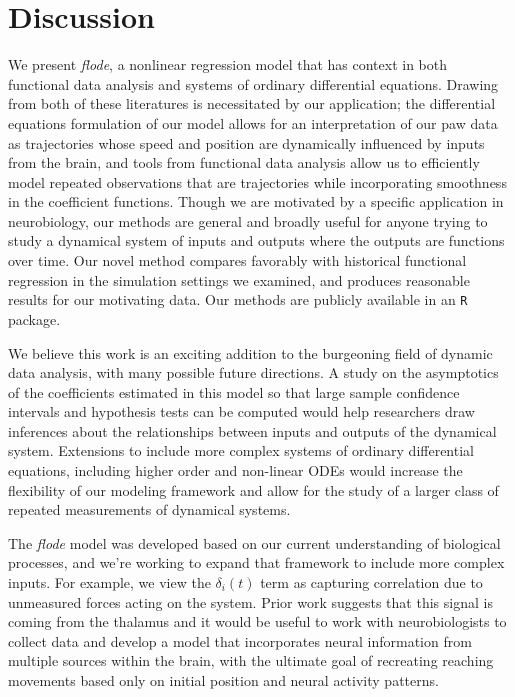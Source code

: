 \documentclass[preprint]{JASA}
\begin{document}
\hypertarget{discussion}{%
\section{Discussion}\label{discussion}}

\label{sec:discussion}

We present \emph{flode}, a nonlinear regression model that has context
in both functional data analysis and systems of ordinary differential
equations. Drawing from both of these literatures is necessitated by our
application; the differential equations formulation of our model allows
for an interpretation of our paw data as trajectories whose speed and
position are dynamically influenced by inputs from the brain, and tools
from functional data analysis allow us to efficiently model repeated
observations that are trajectories while incorporating smoothness in the
coefficient functions. Though we are motivated by a specific application
in neurobiology, our methods are general and broadly useful for anyone
trying to study a dynamical system of inputs and outputs where the
outputs are functions over time. Our novel method compares favorably
with historical functional regression in the simulation settings we
examined, and produces reasonable results for our motivating data. Our
methods are publicly available in an \texttt{R} package.

We believe this work is an exciting addition to the burgeoning field of
dynamic data analysis, with many possible future directions. A study on
the asymptotics of the coefficients estimated in this model so that
large sample confidence intervals and hypothesis tests can be computed
would help researchers draw inferences about the relationships between
inputs and outputs of the dynamical system. Extensions to include more
complex systems of ordinary differential equations, including higher
order and non-linear ODEs would increase the flexibility of our modeling
framework and allow for the study of a larger class of repeated
measurements of dynamical systems.

The \emph{flode} model was developed based on our current understanding
of biological processes, and we're working to expand that framework to
include more complex inputs. For example, we view the \(\delta_i(t)\)
term as capturing correlation due to unmeasured forces acting on the
system. Prior work suggests that this signal is coming from the thalamus
and it would be useful to work with neurobiologists to collect data and
develop a model that incorporates neural information from multiple
sources within the brain, with the ultimate goal of recreating reaching
movements based only on initial position and neural activity patterns.
\end{document}
